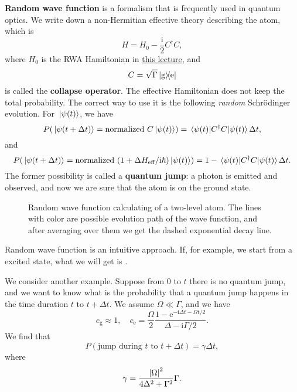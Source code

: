 \documentclass[hyperref, a4paper]{article}
\newcommand*{\ii}{\mathrm{i}}
\newcommand*{\ee}{\mathrm{e}}
\newcommand*{\concept}[1]{{\textbf{#1}}}
\begin{document}
\concept{Random wave function} is a formalism that is frequently used in quantum optics.
We write down a non-Hermitian effective theory describing the atom, which is 
\begin{equation}
    H = H_0 - \frac{\ii}{2} C^\dagger C,
\end{equation}
where $H_0$ is the RWA Hamiltonian in \href{10-28.pdf}{this lecture}, and
\begin{equation}
    C = \sqrt{\Gamma} \dyad{\text{g}}{\text{e}}
\end{equation}
is called the \concept{collapse operator}.
The effective Hamiltonian does not keep the total probability. The correct way to use it is the following 
\emph{random} Schrödinger evolution. For $\ket*{\psi(t)}$, we have 
\begin{equation}
    P(\ket*{\psi(t + \Delta t)} = \text{normalized $C \ket*{\psi(t)}$}) = \expval*{C^\dagger C}{\psi(t)} \Delta t,
\end{equation}
and 
\begin{equation}
    P(\ket*{\psi(t + \Delta t)} = \text{normalized $(1 + \Delta H_\text{eff} / \ii \hbar) \ket*{\psi(t)}$}) 
    = 1 - \expval*{C^\dagger C}{\psi(t)} \Delta t.
\end{equation}
The former possibility is called a \concept{quantum jump}: a photon is emitted and observed, and now we are 
sure that the atom is on the ground state.

\begin{figure}
    \centering
    
    \caption{Random wave function calculating of a two-level atom. The lines with color are possible 
    evolution path of the wave function, and after averaging over them we get the dashed exponential decay
    line.}
    \label{fig:excited-decay}
\end{figure}

Random wave function is an intuitive approach. If, for example, we start from a excited state, 
what we will get is . 

We consider another example. Suppose from $0$ to $t$ there is no quantum jump, and we want to know 
what is the probability that a quantum jump happens in the time duration $t$ to $t + \Delta t$.
We assume $\Omega \ll \Gamma$, and we have 
\begin{equation}
    c_\text{g} \approx 1, \quad c_\text{e} = \frac{\Omega}{2} 
    \frac{1 - \ee^{- \ii \Delta t - \Omega t / 2}}{\Delta - \ii \Gamma / 2}.
\end{equation}
We find that 
\begin{equation}
    P(\text{jump during $t$ to $t + \Delta t$}) = \gamma \Delta t,
\end{equation}
where 
\begin{equation}
    \gamma = \frac{\abs{\Omega}^2}{4 \Delta^2 + \Gamma^2 } \Gamma.
\end{equation}
\end{document}
